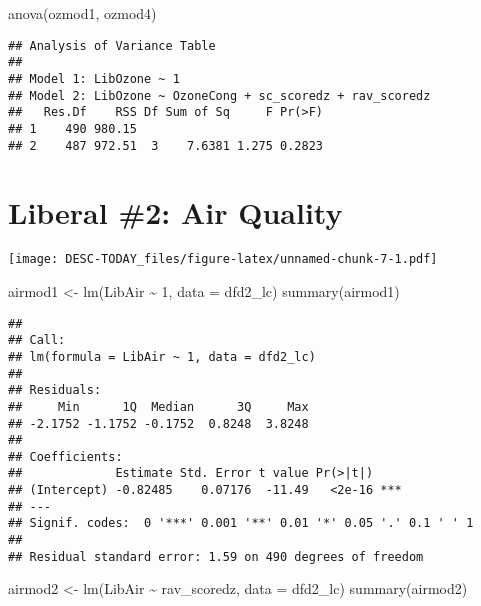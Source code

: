 \documentclass[
]{article}
\newenvironment{Shaded}{\begin{snugshade}}{\end{snugshade}}
\newcommand{\AttributeTok}[1]{\textcolor[rgb]{0.77,0.63,0.00}{#1}}
\newcommand{\DecValTok}[1]{\textcolor[rgb]{0.00,0.00,0.81}{#1}}
\newcommand{\FunctionTok}[1]{\textcolor[rgb]{0.00,0.00,0.00}{#1}}
\newcommand{\NormalTok}[1]{#1}
\newcommand{\OtherTok}[1]{\textcolor[rgb]{0.56,0.35,0.01}{#1}}
\newcommand{\SpecialCharTok}[1]{\textcolor[rgb]{0.00,0.00,0.00}{#1}}
\begin{document}
\begin{Shaded}
\begin{Highlighting}[]
\FunctionTok{anova}\NormalTok{(ozmod1, ozmod4)}
\end{Highlighting}
\end{Shaded}

\begin{verbatim}
## Analysis of Variance Table
## 
## Model 1: LibOzone ~ 1
## Model 2: LibOzone ~ OzoneCong + sc_scoredz + rav_scoredz
##   Res.Df    RSS Df Sum of Sq     F Pr(>F)
## 1    490 980.15                          
## 2    487 972.51  3    7.6381 1.275 0.2823
\end{verbatim}

\hypertarget{liberal-2-air-quality}{%
\section{Liberal \#2: Air Quality}\label{liberal-2-air-quality}}

\texttt{[image: DESC-TODAY\_files/figure-latex/unnamed-chunk-7-1.pdf]}

\begin{Shaded}
\begin{Highlighting}[]
\NormalTok{airmod1 }\OtherTok{\textless{}{-}} \FunctionTok{lm}\NormalTok{(LibAir }\SpecialCharTok{\textasciitilde{}} \DecValTok{1}\NormalTok{, }\AttributeTok{data =}\NormalTok{ dfd2\_lc)}
\FunctionTok{summary}\NormalTok{(airmod1)}
\end{Highlighting}
\end{Shaded}

\begin{verbatim}
## 
## Call:
## lm(formula = LibAir ~ 1, data = dfd2_lc)
## 
## Residuals:
##     Min      1Q  Median      3Q     Max 
## -2.1752 -1.1752 -0.1752  0.8248  3.8248 
## 
## Coefficients:
##             Estimate Std. Error t value Pr(>|t|)    
## (Intercept) -0.82485    0.07176  -11.49   <2e-16 ***
## ---
## Signif. codes:  0 '***' 0.001 '**' 0.01 '*' 0.05 '.' 0.1 ' ' 1
## 
## Residual standard error: 1.59 on 490 degrees of freedom
\end{verbatim}

\begin{Shaded}
\begin{Highlighting}[]
\NormalTok{airmod2 }\OtherTok{\textless{}{-}} \FunctionTok{lm}\NormalTok{(LibAir }\SpecialCharTok{\textasciitilde{}}\NormalTok{ rav\_scoredz, }\AttributeTok{data =}\NormalTok{ dfd2\_lc)}
\FunctionTok{summary}\NormalTok{(airmod2)}
\end{Highlighting}
\end{Shaded}
\end{document}
